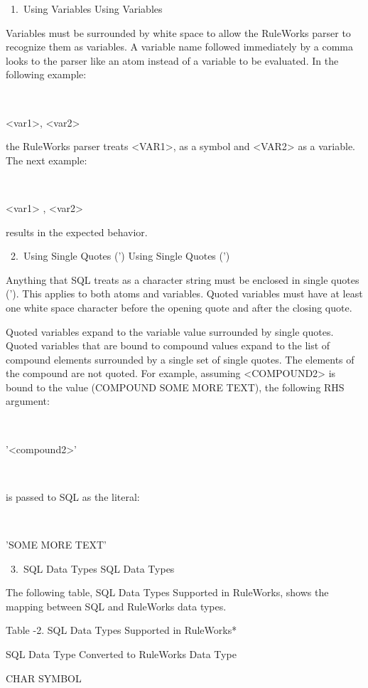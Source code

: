    1. Using Variables Using Variables

      Variables must be surrounded by white space
      to allow the RuleWorks parser to recognize
      them as variables. A variable name followed
      immediately by a comma looks to the parser
      like an atom instead of a variable to be
      evaluated. In the following example:

       

      <var1>, <var2>

      the RuleWorks parser treats <VAR1>, as a
      symbol and <VAR2> as a variable. The next
      example:

       

      <var1> , <var2>

      results in the expected behavior.

   2. Using Single Quotes (') Using Single Quotes
      (')

      Anything that SQL treats as a character
      string must be enclosed in single quotes (').
      This applies to both atoms and variables.
      Quoted variables must have at least one white
      space character before the opening quote and
      after the closing quote.

      Quoted variables expand to the variable value
      surrounded by single quotes. Quoted variables
      that are bound to compound values expand to
      the list of compound elements surrounded by a
      single set of single quotes. The elements of
      the compound are not quoted. For example,
      assuming <COMPOUND2> is bound to the value
      (COMPOUND SOME MORE TEXT), the following RHS
      argument:

       

      '<compound2>'

       

      is passed to SQL as the literal:

       

      'SOME MORE TEXT'

   3. SQL Data Types SQL Data Types

      The following table, SQL Data Types Supported
      in RuleWorks, shows the mapping between SQL
      and RuleWorks data types.

      Table -2. SQL Data Types Supported in
      RuleWorks*

      SQL Data Type  Converted to RuleWorks Data
      Type

      CHAR  SYMBOL

